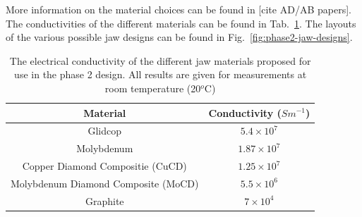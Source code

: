 More information on the material choices can be found in [cite AD/AB papers]. The conductivities of the different materials can be found in Tab.~\ref{tab:phase2-cond}. The layouts of the various possible jaw designs can be found in Fig.~\ref{fig:phase2-jaw-designs}.

\begin{table}
\caption{The electrical conductivity of the different jaw materials proposed for use in the phase 2 design. All results are given for measurements at room temperature (20$^{o}$C)}
\begin{center}
\begin{tabular}{c | c }
Material & Conductivity ($S m^{-1}$) \\ \hline
Glidcop & $5.4 \times 10^{7}$ \\ \hline
Molybdenum & $1.87 \times 10^{7}$ \\ \hline
Copper Diamond Compositie (CuCD) & $1.25 \times 10^{7}$ \\ \hline
Molybdenum Diamond Composite (MoCD) & $5.5 \times 10^{6}$ \\ \hline
Graphite & $7 \times 10^{4}$ \\ \hline
\end{tabular}
\end{center}
\label{tab:phase2-cond}
\end{table}

